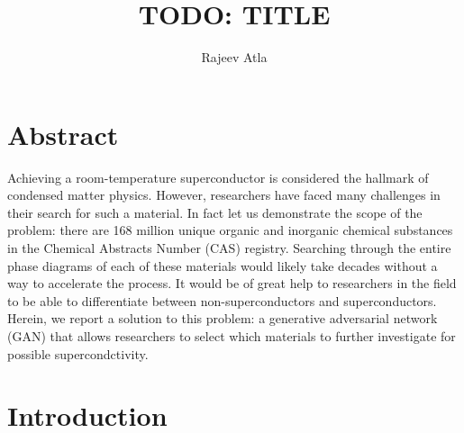 \documentclass{article}
\title{TODO: TITLE}
\author{Rajeev Atla}
\date{}
\begin{document}
\section{Abstract}
Achieving a room-temperature superconductor is considered the hallmark of condensed matter physics.
However, researchers have faced many challenges in their search for such a material.
In fact let us demonstrate the scope of the problem: there are 168 million unique organic and inorganic chemical substances in the Chemical Abstracts Number (CAS) registry.
Searching through the entire phase diagrams of each of these materials would likely take decades without a way to accelerate the process.
It would be of great help to researchers in the field to be able to differentiate between non-superconductors and superconductors.
Herein, we report a solution to this problem: a generative adversarial network (GAN) that allows researchers to select which materials to further investigate for possible supercondctivity.

\section{Introduction}
\end{document}
